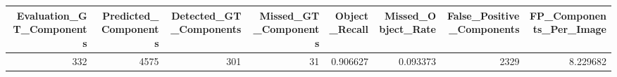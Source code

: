 \begin{tabular}{rrrrrrrr}
\toprule
Evaluation_GT_Components & Predicted_Components & Detected_GT_Components & Missed_GT_Components & Object_Recall & Missed_Object_Rate & False_Positive_Components & FP_Components_Per_Image \\
\midrule
332 & 4575 & 301 & 31 & 0.906627 & 0.093373 & 2329 & 8.229682 \\
\bottomrule
\end{tabular}
